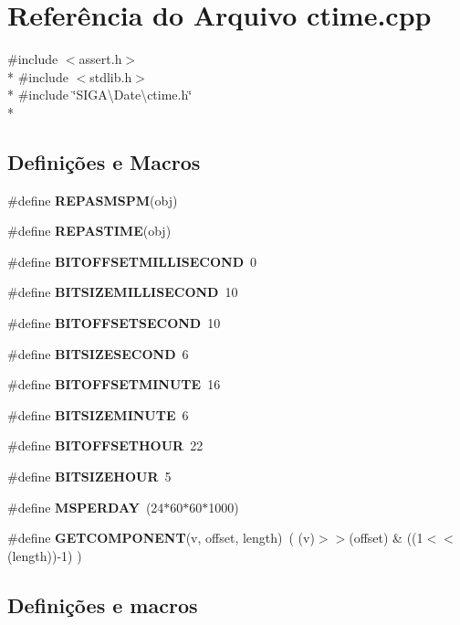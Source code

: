 \section{Referência do Arquivo ctime.\+cpp}
\label{ctime_8cpp}
{\ttfamily \#include $<$assert.\+h$>$}\\*
{\ttfamily \#include $<$stdlib.\+h$>$}\\*
{\ttfamily \#include \char`\"{}S\+I\+G\+A\textbackslash{}\+Date\textbackslash{}ctime.\+h\char`\"{}}\\*
\subsection*{Definições e Macros}
\begin{DoxyCompactItemize}
\item 
\#define {\bf R\+E\+P\+A\+S\+M\+S\+PM}(obj)
\item 
\#define {\bf R\+E\+P\+A\+S\+T\+I\+ME}(obj)
\item 
\#define {\bf B\+I\+T\+O\+F\+F\+S\+E\+T\+M\+I\+L\+L\+I\+S\+E\+C\+O\+ND}~0
\item 
\#define {\bf B\+I\+T\+S\+I\+Z\+E\+M\+I\+L\+L\+I\+S\+E\+C\+O\+ND}~10
\item 
\#define {\bf B\+I\+T\+O\+F\+F\+S\+E\+T\+S\+E\+C\+O\+ND}~10
\item 
\#define {\bf B\+I\+T\+S\+I\+Z\+E\+S\+E\+C\+O\+ND}~6
\item 
\#define {\bf B\+I\+T\+O\+F\+F\+S\+E\+T\+M\+I\+N\+U\+TE}~16
\item 
\#define {\bf B\+I\+T\+S\+I\+Z\+E\+M\+I\+N\+U\+TE}~6
\item 
\#define {\bf B\+I\+T\+O\+F\+F\+S\+E\+T\+H\+O\+UR}~22
\item 
\#define {\bf B\+I\+T\+S\+I\+Z\+E\+H\+O\+UR}~5
\item 
\#define {\bf M\+S\+P\+E\+R\+D\+AY}~(24$\ast$60$\ast$60$\ast$1000)
\item 
\#define {\bf G\+E\+T\+C\+O\+M\+P\+O\+N\+E\+NT}(v,  offset,  length)~( (v)$>$$>$(offset) \& ((1$<$$<$(length))-\/1) )
\end{DoxyCompactItemize}


\subsection{Definições e macros}
